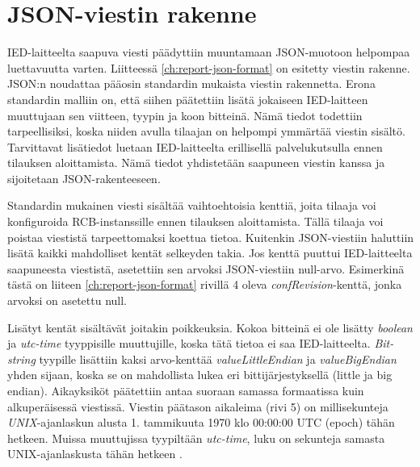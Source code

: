 \section{JSON-viestin rakenne}
IED-laitteelta saapuva viesti päädyttiin muuntamaan JSON-muotoon helpompaa luettavuutta varten. Liitteessä \ref{ch:report-json-format} on esitetty viestin rakenne. JSON:n noudattaa pääosin standardin mukaista viestin rakennetta. Erona standardin malliin on, että siihen päätettiin lisätä jokaiseen IED-laitteen muuttujaan sen viitteen, tyypin ja koon bitteinä. Nämä tiedot todettiin tarpeellisiksi, koska niiden avulla tilaajan on helpompi ymmärtää viestin sisältö. Tarvittavat lisätiedot luetaan IED-laitteelta erillisellä palvelukutsulla ennen tilauksen aloittamista. Nämä tiedot yhdistetään saapuneen viestin kanssa ja sijoitetaan JSON-rakenteeseen.

Standardin mukainen viesti sisältää vaihtoehtoisia kenttiä, joita tilaaja voi konfiguroida RCB-instanssille ennen tilauksen aloittamista. Tällä tilaaja voi poistaa viestistä tarpeettomaksi koettua tietoa. Kuitenkin JSON-viestiin haluttiin lisätä kaikki mahdolliset kentät selkeyden takia. Jos kenttä puuttui IED-laitteelta saapuneesta viestistä, asetettiin sen arvoksi JSON-viestiin null-arvo. Esimerkinä tästä on liiteen \ref{ch:report-json-format} rivillä 4 oleva \emph{confRevision}-kenttä, jonka arvoksi on asetettu null.

Lisätyt kentät sisältävät joitakin poikkeuksia. Kokoa bitteinä ei ole lisätty \emph{boolean} ja \emph{utc-time} tyyppisille muuttujille, koska tätä tietoa ei saa IED-laitteelta. \emph{Bit-string} tyypille lisättiin kaksi arvo-kenttää \emph{valueLittleEndian} ja \emph{valueBigEndian} yhden sijaan, koska se on mahdollista lukea eri bittijärjestyksellä (little ja big endian). Aikayksiköt päätettiin antaa suoraan samassa formaatissa kuin alkuperäisessä viestissä. Viestin päätason aikaleima (rivi 5) on millisekunteja \emph{UNIX}-ajanlaskun alusta 1. tammikuuta 1970 klo 00:00:00 UTC (epoch) tähän hetkeen. Muissa muuttujissa tyypiltään \emph{utc-time}, luku on sekunteja samasta UNIX-ajanlaskusta tähän hetkeen \mbox{\cite[s.~26--27]{IEC61850-7-2}}.